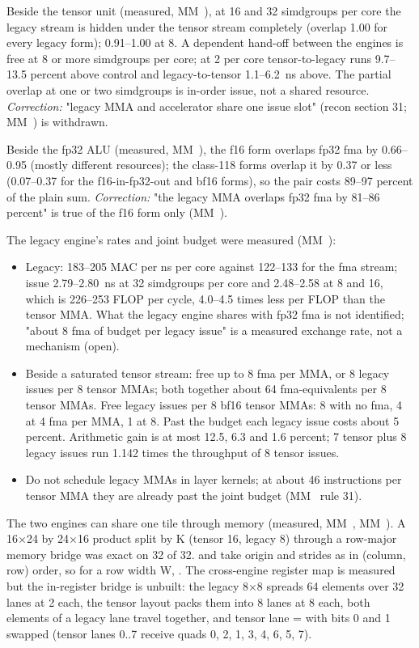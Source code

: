 Beside the tensor unit (measured, MM~), at 16 and 32 simdgroups per core the legacy stream is hidden under
the tensor stream completely (overlap 1.00 for every legacy form); 0.91–1.00 at 8. A dependent hand-off between the
engines is free at 8 or more simdgroups per core; at 2 per core tensor-to-legacy runs 9.7–13.5 percent above control
and legacy-to-tensor 1.1–6.2~ns above. The partial overlap at one or two simdgroups is in-order issue, not a shared
resource. \emph{Correction:} "legacy MMA and accelerator share one issue slot" (recon section 31; MM~) is withdrawn.

Beside the fp32 ALU (measured, MM~), the f16 form overlaps fp32 fma by 0.66–0.95 (mostly different
resources); the class-118 forms overlap it by 0.37 or less (0.07–0.37 for the f16-in-fp32-out and bf16 forms), so the
pair costs 89–97 percent of the plain sum. \emph{Correction:} "the legacy MMA overlaps fp32 fma by 81–86 percent" is true of
the f16 form only (MM~).

The legacy engine's rates and joint budget were measured (MM~):

\begin{itemize}
\item Legacy: 183–205 MAC per ns per core against 122–133 for the fma stream; issue 2.79–2.80~ns at 32 simdgroups per
  core and 2.48–2.58 at 8 and 16, which is 226–253 FLOP per cycle, 4.0–4.5 times less per FLOP than the tensor MMA.
  What the legacy engine shares with fp32 fma is not identified; "about 8 fma of budget per legacy issue" is a measured
  exchange rate, not a mechanism (open).
\item Beside a saturated tensor stream: free up to 8 fma per MMA, or 8 legacy issues per 8 tensor MMAs; both together about
  64 fma-equivalents per 8 tensor MMAs. Free legacy issues per 8 bf16 tensor MMAs: 8 with no fma, 4 at 4 fma per MMA,
  1 at 8. Past the budget each legacy issue costs about 5 percent. Arithmetic gain is at most 12.5, 6.3 and 1.6
  percent; 7 tensor plus 8 legacy issues run 1.142 times the throughput of 8 tensor issues.
\item Do not schedule legacy MMAs in layer kernels; at about 46 instructions per tensor MMA they are already past
  the joint budget (MM~ rule 31).
\end{itemize}

The two engines can share one tile through memory (measured, MM~, MM~). A 16×24 by 24×16 product split by K
(tensor 16, legacy 8) through a row-major memory bridge was exact on 32 of 32.  and  take origin and
strides as  in (column, row) order, so for a row width W, . The cross-engine register map
is measured but the in-register bridge is unbuilt: the legacy 8×8 spreads 64 elements over 32 lanes at 2 each, the
tensor layout packs them into 8 lanes at 8 each, both elements of a legacy lane travel together, and tensor lane =
 with bits 0 and 1 swapped (tensor lanes 0..7 receive quads 0, 2, 1, 3, 4, 6, 5, 7).

